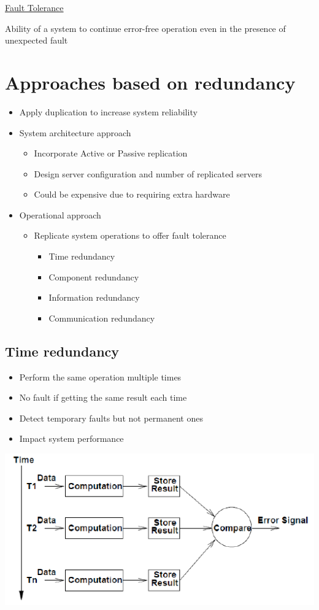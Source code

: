 \documentclass{article}[18pt]
\begin{document}
\begin{center}
\underline{\huge Fault Tolerance}
\end{center}
\begin{definition}
Ability of a system to continue error-free operation even in the presence of unexpected fault
\end{definition}
\section{Approaches based on redundancy}
\begin{itemize}
	\item Apply duplication to increase system reliability
	\item System architecture approach
	\begin{itemize}
		\item Incorporate Active or Passive replication
		\item Design server configuration and number of replicated servers
		\item Could be expensive due to requiring extra hardware
	\end{itemize}
	\item Operational approach
	\begin{itemize}
		\item Replicate system operations to offer fault tolerance
		\begin{itemize}
			\item Time redundancy
			\item Component redundancy
			\item Information redundancy
			\item Communication redundancy
		\end{itemize}
	\end{itemize}
\end{itemize}
\subsection{Time redundancy}
\begin{itemize}
	\item Perform the same operation multiple times
	\item No fault if getting the same result each time
	\item Detect temporary faults but not permanent ones
	\item Impact system performance
\end{itemize}
\begin{center}
	\includegraphics[scale=0.7]{"Time Redundancy"}
\end{center}
\end{document}
